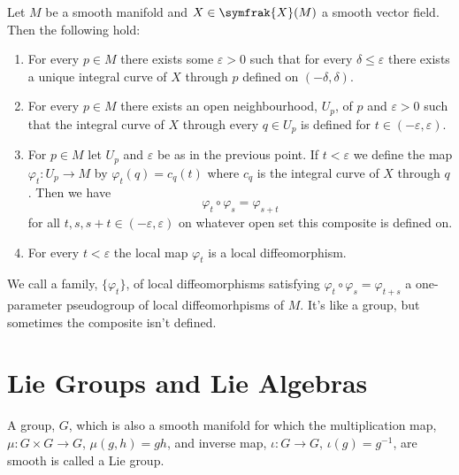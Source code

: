 \documentclass[fleqn]{NotesClass}
\newcommand{\vectorFields}{\symfrak{X}}
\begin{document}
    \begin{prp}{}{}
        Let \(M\) be a smooth manifold and \(X \in \vectorFields(M)\) a smooth vector field.
        Then the following hold:
        \begin{enumerate}
            \item For every \(p \in M\) there exists some \(\varepsilon > 0\) such that for every \(\delta \le \varepsilon\) there exists a unique integral curve of \(X\) through \(p\) defined on \((-\delta, \delta)\).
            \item For every \(p \in M\) there exists an open neighbourhood, \(U_p\), of \(p\) and \(\varepsilon > 0\) such that the integral curve of \(X\) through every \(q \in U_p\) is defined for \(t \in (-\varepsilon, \varepsilon)\).
            \item For \(p \in M\) let \(U_p\) and \(\varepsilon\) be as in the previous point.
            If \(t < \varepsilon\) we define the map \(\varphi_t \colon U_p \to M\) by \(\varphi_t(q) = c_q(t)\) where \(c_q\) is the integral curve of \(X\) through \(q\).
            Then we have
            \begin{equation}
                \varphi_t \circ \varphi_s = \varphi_{s + t}
            \end{equation}
            for all \(t, s, s + t \in (-\varepsilon, \varepsilon)\) on whatever open set this composite is defined on.
            \item For every \(t < \varepsilon\) the local map \(\varphi_t\) is a local diffeomorphism.
        \end{enumerate}
    \end{prp}
    
    We call a family, \(\{\varphi_t\}\), of local diffeomorphisms satisfying \(\varphi_t \circ \varphi_s = \varphi_{t + s}\) a one-parameter pseudogroup of local diffeomorhpisms of \(M\).
    It's like a group, but sometimes the composite isn't defined.
    
    \section{Lie Groups and Lie Algebras}
    \begin{dfn}{}{}
        A group, \(G\), which is also a smooth manifold for which the multiplication map, \(\mu \colon G \times G \to G\), \(\mu(g, h) = gh\), and inverse map, \(\iota \colon G \to G\), \(\iota(g) = g^{-1}\), are smooth is called a Lie group.
    \end{dfn}
    
\end{document}
